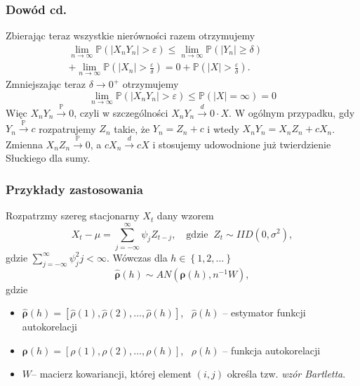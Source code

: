 \documentclass{beamer}
\begin{document}
	\begin{frame}
		\frametitle{Dowód cd.}
		Zbierając teraz wszystkie nierówności razem otrzymujemy
		\begin{equation}
			\begin{split}
				\lim\limits_{n\to\infty}\mathbb{P}\left(|X_nY_n|>\varepsilon\right)\leq\lim\limits_{n\to\infty}\mathbb{P}\left(|Y_n|\geq\delta\right)\phantom{cccccccc}\\+
				\lim\limits_{n\to\infty}\mathbb{P}\left(|X_n|>\frac{\varepsilon}{\delta}\right)=0+\mathbb{P}\left(|X|>\frac{\varepsilon}{\delta}\right).
			\end{split}
		\end{equation}\pause
		Zmniejszając teraz $\delta\to0^+$ otrzymujemy
		\begin{equation}
			\lim\limits_{n\to\infty}\mathbb{P}\left(|X_nY_n|>\varepsilon\right)\leq \mathbb{P}\left(|X|=\infty\right)=0
		\end{equation}
		Więc $X_nY_n\xrightarrow{\mathbb{P}}0$, czyli w szczególności $X_nY_n\xrightarrow{d}0\cdot X$. \pause W ogólnym przypadku, gdy $Y_n\xrightarrow{\mathbb{P}}c$ rozpatrujemy $Z_n$ takie, że $Y_n=Z_n+c$ i wtedy $X_nY_n = X_nZ_n + cX_n$. Zmienna $X_nZ_n\xrightarrow{\mathbb{P}}0$, a $cX_n\xrightarrow{d}cX$ i stosujemy udowodnione już twierdzienie Słuckiego dla sumy. 
	\end{frame}

	\begin{frame}
		\frametitle{Przykłady zastosowania}
		Rozpatrzmy szereg stacjonarny $X_t$ dany wzorem
		\begin{equation}
			X_t-\mu=\sum_{j=-\infty}^{\infty}\psi_j Z_{t-j}, \quad\text{gdzie }\ Z_t\sim IID(0,\sigma^2),
		\end{equation}
		gdzie $\sum_{j=-\infty}^\infty\psi_j^2j<\infty$. Wówczas dla $h\in\left\{1, 2, \dots\right\}$ 
		\begin{equation}
			\hat{\boldsymbol{\rho}}(h)\sim AN(\boldsymbol\rho(h), n^{-1}W),
		\end{equation}
		gdzie 
		\begin{itemize}
			\item $\hat{\boldsymbol{\rho}}(h)=\left[\hat\rho(1),\hat\rho(2),\dots,\hat\rho(h)\right]$, \ $\hat\rho(h)$ -- estymator funkcji autokorelacji
			\item $\boldsymbol{\rho}(h)=\left[\rho(1),\rho(2),\dots,\rho(h)\right]$, \ $\rho(h)$ --  funkcja autokorelacji
			\item $W$--  macierz kowariancji, której element $(i, j)$ określa tzw. \emph{wzór Bartletta}.
		\end{itemize}
	\end{frame}
\end{document}
